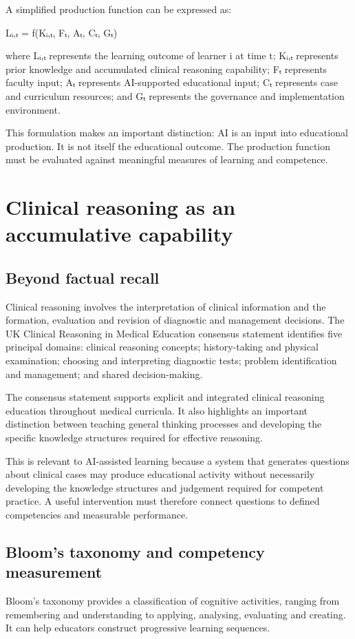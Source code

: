 \documentclass[11pt,a4paper]{article}
\begin{document}
A simplified production function can be expressed as:

Lᵢ,ₜ = f(Kᵢ,ₜ, Fₜ, Aₜ, Cₜ, Gₜ)

where Lᵢ,ₜ represents the learning outcome of learner i at time t; Kᵢ,ₜ represents prior knowledge and accumulated clinical reasoning capability; Fₜ represents faculty input; Aₜ represents AI-supported educational input; Cₜ represents case and curriculum resources; and Gₜ represents the governance and implementation environment.

This formulation makes an important distinction: AI is an input into educational production. It is not itself the educational outcome. The production function must be evaluated against meaningful measures of learning and competence.

\section{Clinical reasoning as an accumulative capability}
\subsection{Beyond factual recall}
Clinical reasoning involves the interpretation of clinical information and the formation, evaluation and revision of diagnostic and management decisions. The UK Clinical Reasoning in Medical Education consensus statement identifies five principal domains: clinical reasoning concepts; history-taking and physical examination; choosing and interpreting diagnostic tests; problem identification and management; and shared decision-making.

The consensus statement supports explicit and integrated clinical reasoning education throughout medical curricula. It also highlights an important distinction between teaching general thinking processes and developing the specific knowledge structures required for effective reasoning.

This is relevant to AI-assisted learning because a system that generates questions about clinical cases may produce educational activity without necessarily developing the knowledge structures and judgement required for competent practice. A useful intervention must therefore connect questions to defined competencies and measurable performance.

\subsection{Bloom's taxonomy and competency measurement}
Bloom's taxonomy provides a classification of cognitive activities, ranging from remembering and understanding to applying, analysing, evaluating and creating. It can help educators construct progressive learning sequences.
\end{document}
